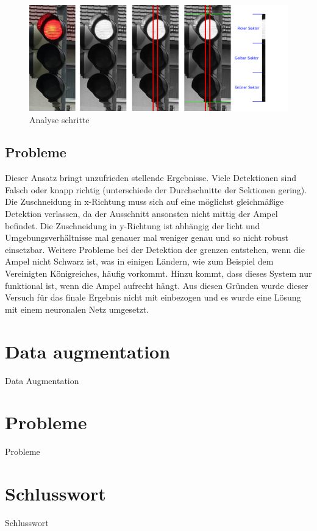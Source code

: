 \documentclass[a4paper,oneside,12pt]{report}
\begin{document}
\begin{onehalfspace}
		\begin{figure}[h!]
			\includegraphics[width=\linewidth]{TLCropping.jpg}
			\caption{Analyse schritte}
			\label{fig:TLCrop}
		\end{figure}
		\section{Probleme}
		Dieser Ansatz bringt unzufrieden stellende Ergebnisse. Viele Detektionen sind Falsch oder knapp richtig (unterschiede der Durchschnitte der Sektionen gering). Die Zuschneidung in x-Richtung muss sich auf eine möglichst gleichmäßige Detektion verlassen, da der Ausschnitt ansonsten nicht mittig der Ampel befindet. Die Zuschneidung in y-Richtung ist abhängig der licht und Umgebungsverhältnisse mal genauer mal weniger genau und so nicht robust einsetzbar. Weitere Probleme bei der Detektion der grenzen entstehen, wenn die Ampel nicht Schwarz ist, was in einigen Ländern, wie zum Beispiel dem Vereinigten Königreiches, häufig vorkommt. Hinzu kommt, dass dieses System nur funktional ist, wenn die Ampel aufrecht hängt. Aus diesen Gründen wurde dieser Versuch für das finale Ergebnis nicht mit einbezogen und es wurde eine Lösung mit einem neuronalen Netz umgesetzt.
		
		
	\end{onehalfspace}
	\chapter{Data augmentation}
	\begin{onehalfspace}
		Data Augmentation
	\end{onehalfspace}
	\chapter{Probleme}
	\begin{onehalfspace}
		Probleme
	\end{onehalfspace}
	\chapter{Schlusswort}
	\begin{onehalfspace}
		Schlusswort
	\end{onehalfspace}
	
\end{document}
